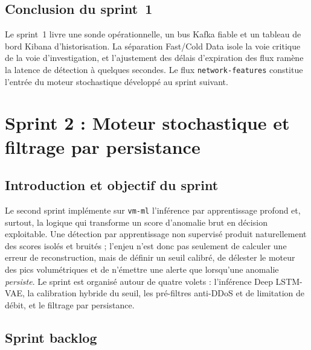 
\subsection{Conclusion du sprint~1}

Le sprint~1 livre une sonde opérationnelle, un bus Kafka fiable et un tableau de bord Kibana d'historisation. La séparation Fast/Cold Data isole la voie critique de la voie d'investigation, et l'ajustement des délais d'expiration des flux ramène la latence de détection à quelques secondes. Le flux \texttt{network-features} constitue l'entrée du moteur stochastique développé au sprint suivant.

\section{Sprint 2 : Moteur stochastique et filtrage par persistance}
\label{sec:sprint2}

\subsection{Introduction et objectif du sprint}

Le second sprint implémente sur \texttt{vm-ml} l'inférence par apprentissage profond et, surtout, la logique qui transforme un score d'anomalie brut en décision exploitable. Une détection par apprentissage non supervisé produit naturellement des scores isolés et bruités ; l'enjeu n'est donc pas seulement de calculer une erreur de reconstruction, mais de définir un seuil calibré, de délester le moteur des pics volumétriques et de n'émettre une alerte que lorsqu'une anomalie \emph{persiste}. Le sprint est organisé autour de quatre volets : l'inférence Deep LSTM-VAE, la calibration hybride du seuil, les pré-filtres anti-DDoS et de limitation de débit, et le filtrage par persistance.

\subsection{Sprint backlog}

